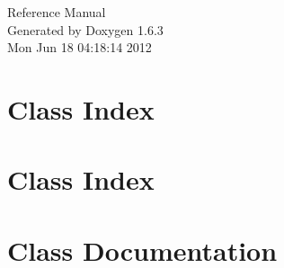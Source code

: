 \documentclass[a4paper]{book}
\begin{document}
\hypersetup{pageanchor=false}
\begin{titlepage}
\vspace*{7cm}
\begin{center}
{\Large Reference Manual}\\
\vspace*{1cm}
{\large Generated by Doxygen 1.6.3}\\
\vspace*{0.5cm}
{\small Mon Jun 18 04:18:14 2012}\\
\end{center}
\end{titlepage}
\clearemptydoublepage
{}
\tableofcontents
\clearemptydoublepage
{}
\hypersetup{pageanchor=true}
\chapter{Class Index}

\chapter{Class Index}

\chapter{Class Documentation}













































\printindex
\end{document}
